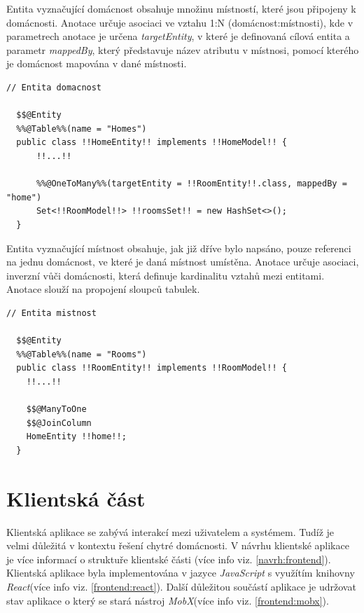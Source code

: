 Entita vyznačující domácnost obsahuje množinu místností, které jsou připojeny k domácnosti.
Anotace  určuje asociaci ve vztahu 1:N (domácnost:místnosti), kde v parametrech anotace je určena \emph{targetEntity}, v které je definovaná cílová entita a
parametr \emph{mappedBy}, který představuje název atributu v místnosi, pomocí kterého je domácnost mapována v dané místnosti.

\begin{lstlisting}[style=JavaStyle, caption={Ukázka asociace 1:N (domácnost:místnosti)}]
  // Entita domacnost
  
  $$@Entity
  %%@Table%%(name = "Homes")
  public class !!HomeEntity!! implements !!HomeModel!! {
      !!...!!

      %%@OneToMany%%(targetEntity = !!RoomEntity!!.class, mappedBy = "home")
      Set<!!RoomModel!!> !!roomsSet!! = new HashSet<>();
  }
\end{lstlisting}

Entita vyznačující místnost obsahuje, jak již dříve bylo napsáno, pouze referenci na jednu domácnost, ve které je daná místnost umístěna.
Anotace  určuje asociaci, inverzní vůči domácnosti, která definuje kardinalitu vztahů mezi entitami.
Anotace  slouží na propojení sloupců tabulek.

\begin{lstlisting}[style=JavaStyle,caption={Ukázka asociace 1:N (domácnost:místnosti)}]
  // Entita mistnost
  
  $$@Entity
  %%@Table%%(name = "Rooms")
  public class !!RoomEntity!! implements !!RoomModel!! {
    !!...!!

    $$@ManyToOne
    $$@JoinColumn
    HomeEntity !!home!!;
  }
\end{lstlisting}

\newpage
\section{Klientská část}
\label{impl:frontend}
Klientská aplikace se zabývá interakcí mezi uživatelem a systémem.
Tudíž je velmi důležitá v kontextu řešení chytré domácnosti.
V návrhu klientské aplikace je více informací o struktuře klientské části (více info viz. \ref{navrh:frontend}).
Klientská aplikace byla implementována v jazyce \emph{JavaScript} s využítím knihovny \emph{React}(více info viz. \ref{frontend:react}).
Další důležitou součástí aplikace je udržovat stav aplikace o který se stará nástroj \emph{MobX}(více info viz. \ref{frontend:mobx}).

